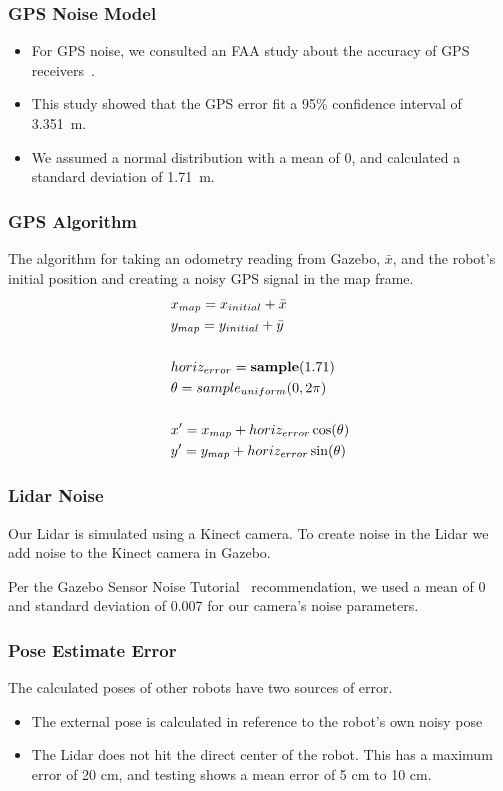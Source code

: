 \documentclass[14pt]{beamer}
\begin{document}
\begin{frame}
\frametitle{GPS Noise Model}
\begin{itemize}
\item For GPS noise, we consulted an FAA study about the accuracy of GPS receivers~\cite{FAAGPS}.
\pause
\item This study showed that the GPS error fit a 95\% confidence interval of \SI{3.351}{\meter}.
\pause
\item We assumed a normal distribution with a mean of 0, and calculated a standard deviation of \SI{1.71}{\meter}.
\end{itemize}


\end{frame}
\begin{frame}
\frametitle{GPS Algorithm}
The algorithm for taking an odometry reading from Gazebo, $\bar{x}$, and the robot's initial position and creating a noisy GPS signal in the map frame.
\begin{align}
&x_{map} = x_{initial} + \bar{x}\\
&y_{map} = y_{initial} + \bar{y}\\
\notag \\
&horiz_{error} = \textbf{sample}(1.71)\\
&\theta = \textbf{$sample_{uniform}$}(0, 2\pi)\\
\notag \\
&x' = x_{map} + horiz_{error}\cos(\theta)\\
&y' = y_{map}+ horiz_{error}\sin(\theta)
\end{align}
\end{frame}

\begin{frame}
\frametitle{Lidar Noise}
Our Lidar is simulated using a Kinect camera. To create noise in the Lidar we add noise to the Kinect camera in Gazebo.
\pause 

\vspace{14pt}
Per the Gazebo Sensor Noise Tutorial~\cite{GazeboSensorNoise} recommendation, we used a mean of 0 and standard deviation of 0.007 for our camera's noise parameters.
\end{frame}

\begin{frame}
\frametitle{Pose Estimate Error}
The calculated poses of other robots have two sources of error.
\begin{itemize}
\pause
\item The external pose is calculated in reference to the robot's own noisy pose
\pause
\item The Lidar does not hit the direct center of the robot. This has a maximum error of 20 \si{\cm}, and testing shows a mean error of 5 \si{\cm} to 10 \si{\cm}.
\end{itemize}
\end{frame}
\end{document}
